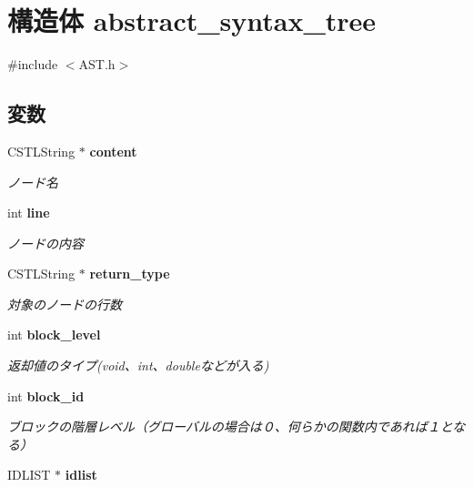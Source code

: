 \section{構造体 abstract\_\-syntax\_\-tree}
\label{structabstract__syntax__tree}


{\ttfamily \#include $<$AST.h$>$}

\subsection*{変数}
\begin{DoxyCompactItemize}
\item 
CSTLString $\ast$ {\bf content}\label{structabstract__syntax__tree_a1d3ebb923055b39ec93220a82010c9a5}

\begin{DoxyCompactList}\small\item\em ノード名 \item\end{DoxyCompactList}\item 
int {\bf line}\label{structabstract__syntax__tree_a16de2988d91f99ee9324a8e27e59314a}

\begin{DoxyCompactList}\small\item\em ノードの内容 \item\end{DoxyCompactList}\item 
CSTLString $\ast$ {\bf return\_\-type}\label{structabstract__syntax__tree_a427a4655976ce8284a3197e9d9a9b856}

\begin{DoxyCompactList}\small\item\em 対象のノードの行数 \item\end{DoxyCompactList}\item 
int {\bf block\_\-level}\label{structabstract__syntax__tree_a9da95b72b69ccebafe64a6cdff6735b1}

\begin{DoxyCompactList}\small\item\em 返却値のタイプ(void、int、doubleなどが入る) \item\end{DoxyCompactList}\item 
int {\bf block\_\-id}\label{structabstract__syntax__tree_a1130545fa7b86f9006c3b68b0943a33a}

\begin{DoxyCompactList}\small\item\em ブロックの階層レベル（グローバルの場合は０、何らかの関数内であれば１となる） \item\end{DoxyCompactList}\item 
IDLIST $\ast$ {\bf idlist}\label{structabstract__syntax__tree_a9207cfa97354e44aae39c4686a924357}


\end{DoxyCompactItemize}
